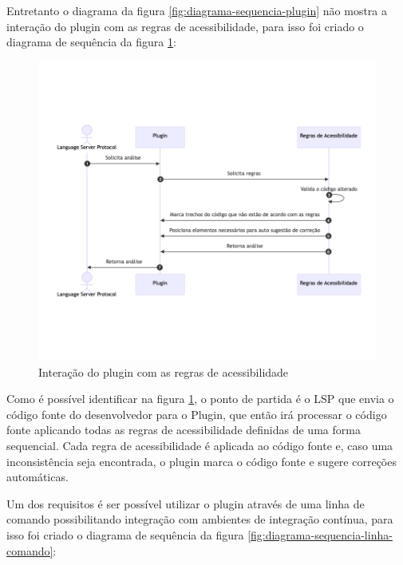 Entretanto o diagrama da figura \ref{fig:diagrama-sequencia-plugin} não mostra a interação do plugin com as regras de acessibilidade, para isso foi criado o diagrama de sequência da figura \ref{fig:diagrama-sequencia-regra-acessibilidade}:

\begin{figure}[!ht]
  \centering
  \caption{Interação do plugin com as regras de acessibilidade}\label{fig:diagrama-sequencia-regra-acessibilidade}
  \includegraphics[width=325pt]{Assets/DiagramaPluginRegrasAcessibilidade.png}
\end{figure}

Como é possível identificar na figura \ref{fig:diagrama-sequencia-regra-acessibilidade}, o ponto de partida é o LSP que envia o código fonte do desenvolvedor para o Plugin, que então irá processar o código fonte aplicando todas as regras de acessibilidade definidas de uma forma sequencial. Cada regra de acessibilidade é aplicada ao código fonte e, caso uma inconsistência seja encontrada, o plugin marca o código fonte e sugere correções automáticas.

Um dos requisitos é ser possível utilizar o plugin através de uma linha de comando possibilitando integração com ambientes de integração contínua, para isso foi criado o diagrama de sequência da figura \ref{fig:diagrama-sequencia-linha-comando}:

